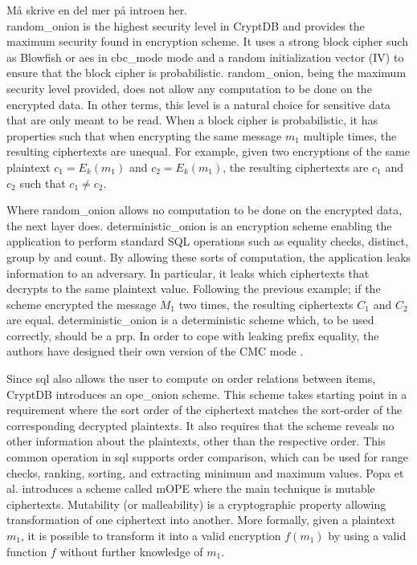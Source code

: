 Må skrive en del mer på introen her.\\

\Gls{random_onion} is the highest security level in CryptDB and provides the maximum security found in encryption scheme. It uses a strong block cipher such as Blowfish or \Gls{aes} in \Gls{cbc_mode} mode and a random initialization vector (IV) to ensure that the block cipher is probabilistic. \Gls{random_onion}, being the maximum security level provided, does not allow any computation to be done on the encrypted data. In other terms, this level is a natural choice for sensitive data that are only meant to be read. When a block cipher is probabilistic, it has properties such that when encrypting the same message $m_1$ multiple times, the resulting ciphertexts are unequal. For example, given two encryptions of the same plaintext $c_1 = E_k(m_1)$ and $c_2 = E_k(m_1)$, the resulting ciphertexts are $c_1$ and $c_2$ such that $c_1 \neq c_2$.



Where \Gls{random_onion} allows no computation to be done on the encrypted data, the next layer does. \Gls{deterministic_onion} is an encryption scheme enabling the application to perform standard SQL operations such as equality checks, distinct, group by and count. By allowing these sorts of computation, the application leaks information to an adversary. In particular, it leaks which ciphertexts that decrypts to the same plaintext value. Following the previous example; if the scheme encrypted the message $M_1$ two times, the resulting ciphertexts $C_1$ and $C_2$ are equal. \Gls{deterministic_onion} is a deterministic scheme which, to be used correctly, should be a \Gls{prp}. In order to cope with leaking prefix equality, the authors have designed their own version of the CMC mode \cite{CryptDB_Main_Paper}.



Since \Gls{sql} also allows the user to compute on order relations between items, CryptDB introduces an \Gls{ope_onion} scheme. \citep{CryptDB_Main_Paper} This scheme takes starting point in a requirement where the sort order of the ciphertext matches the sort-order of the corresponding decrypted plaintexts. It also requires that the scheme reveals no other information about the plaintexts, other than the respective order. This common operation in \Gls{sql} supports order comparison, which can be used for range checks, ranking, sorting, and extracting minimum and maximum values. Popa et al. \cite{CryptDB_OPE_Encoding} introduces a scheme called \Gls{mOPE} where the main technique is mutable ciphertexts. Mutability (or malleability) is a cryptographic property allowing transformation of one ciphertext into another. More formally, given a plaintext $m_1$, it is possible to transform it into a valid encryption $f(m_1)$ by using a valid function $f$ without further knowledge of $m_1$.

